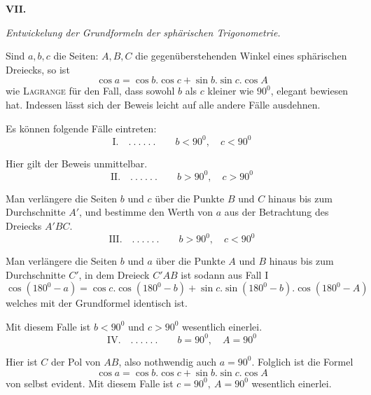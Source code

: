 %
\par\medskip{}
\centerline{\textbf{VII.}}\nobreak\smallskip
\begin{center}\textit{Entwickelung der Grundformeln der sphärischen Trigonometrie.}\end{center}
\hspace*{\parindent}Sind \(a,b,c\) die Seiten: \(A,B,C\) die gegenüberstehenden Winkel eines sphärischen Dreiecks, so ist
\[
\cos a=\cos b.\cos c+\sin b.\sin c.\cos A
\]
wie \textsc{Lagrange} für den Fall, dass sowohl \(b\) als \(c\) kleiner wie \(90^0\), elegant bewiesen hat. Indessen lässt sich der Beweis leicht auf alle andere Fälle ausdehnen.

Es können folgende Fälle eintreten:
\[
\text{I.}\quad .\ .\ .\ .\ .\ .\qquad b<90^0,\quad c<90^0
\]
\par
Hier gilt der Beweis unmittelbar.
\[
\text{II.}\quad .\ .\ .\ .\ .\ .\qquad b>90^0,\quad c>90^0
\]
\par
Man verlängere die Seiten \(b\) und \(c\) über die Punkte \(B\) und \(C\) hinaus bis zum Durchschnitte \(A'\), und bestimme den Werth von \(a\) aus der Betrachtung des Dreiecks \(A'BC\).
\[
\text{III.}\quad .\ .\ .\ .\ .\ .\qquad b>90^0,\quad c<90^0
\]
\par
Man verlängere die Seiten \(b\) und \(a\) über die Punkte \(A\) und \(B\) hinaus bis zum Durchschnitte \(C'\), in dem Dreieck \(C'AB\) ist sodann aus Fall I
\[
\cos(180^0-a)=\cos c.\cos(180^0-b)+\sin c.\sin(180^0-b).\cos(180^0-A)
\]
welches mit der Grundformel identisch ist.

Mit diesem Falle ist \(b<90^0\) und \(c>90^0\) wesentlich einerlei.
\[
\text{IV.}\quad .\ .\ .\ .\ .\ .\qquad b=90^0,\quad A=90^0
\]
\par
Hier ist \(C\) der Pol von \(AB\), also nothwendig auch \(a=90^0\). Folglich ist die Formel
\[
\cos a=\cos b.\cos c+\sin b.\sin c.\cos A
\]
von selbst evident. Mit diesem Falle ist \(c=90^0,\ A=90^0\) wesentlich einerlei.
